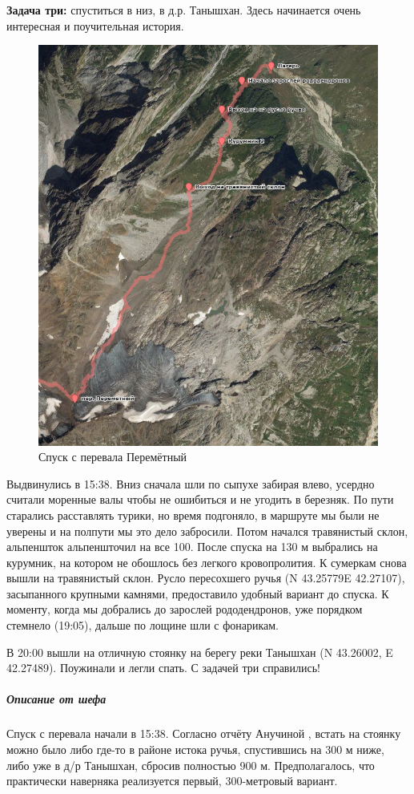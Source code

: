\textbf{Задача три:} спуститься в низ, в д.р. Танышхан. Здесь начинается очень интересная и поучительная история.
\begin{figure}[h!]
	\centering
	\includegraphics[width=0.7\linewidth]{../pics/perem_down.png}
	\caption{Спуск с перевала Перемётный}
	\label{perem_down}
\end{figure} 
Выдвинулись в 15:38. Вниз сначала шли по сыпухе забирая влево, усердно считали моренные валы чтобы не ошибиться и не угодить в березняк. По пути старались расставлять турики, но время подгоняло, в маршруте мы были не  уверены и на полпути мы это дело забросили.  Потом начался травянистый склон, альпеншток альпеншточил на все 100. После спуска на 130 м выбрались на курумник, на котором не обошлось без легкого кровопролития. К сумеркам снова вышли на травянистый склон. Русло пересохшего ручья (N 43.25779\degree E 42.27107\degree), засыпанного крупными камнями, предоставило удобный вариант до спуска. К моменту, когда мы добрались до зарослей рододендронов, уже порядком стемнело (19:05), дальше по лощине шли с фонарикам. 

В 20:00 вышли на отличную стоянку на берегу реки Танышхан (N 43.26002, E 42.27489). Поужинали и легли спать. С задачей три справились! 

\subparagraph{Описание от шефа} 

Спуск с перевала начали в 15:38. Согласно отчёту Анучиной \cite{Anuchina2019}, встать на стоянку можно было либо где-то в районе истока ручья, спустившись на 300 м ниже, либо уже в д/р Танышхан, сбросив полностью 900 м. Предполагалось, что практически наверняка реализуется первый, 300-метровый вариант. 

